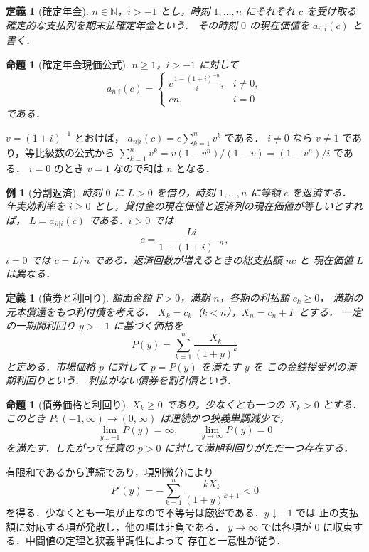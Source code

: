 \documentclass[a5paper,10pt,onecolumn]{jsarticle}
\makeatletter
\theoremstyle{mathnotetheorem}
\newtheorem{definition}[theorem]{定義}
\newtheorem{proposition}[theorem]{命題}
\newtheorem{example}[theorem]{例}
\renewcommand{\proofname}{証明}
\renewenvironment{proof}[1][\proofname]{%
  \par\pushQED{\qed}\normalfont\topsep4\p@\@plus2\p@\relax
  \trivlist\item[\hskip\labelsep\bfseries #1]\ignorespaces
}{\popQED\endtrivlist\@endpefalse}
\makeatother
\begin{document}
\begin{definition}[確定年金]
$n\in\mathbb N$，$i>-1$ とし，時刻 $1,\ldots,n$ にそれぞれ $c$ を受け取る
確定的な支払列を\emph{期末払確定年金}という．
その時刻 $0$ の現在価値を $a_{\overline{n}|i}(c)$ と書く．
\end{definition}

\begin{proposition}[確定年金現価公式]\label{prop:annuity}
$n\ge1$，$i>-1$ に対して
\[
 a_{\overline{n}|i}(c)=
 \begin{cases}
 \displaystyle c\frac{1-(1+i)^{-n}}{i},&i\ne0,\\[4pt]
 cn,&i=0
 \end{cases}
\]
である．
\end{proposition}
\begin{proof}
$v=(1+i)^{-1}$ とおけば，
$a_{\overline{n}|i}(c)=c\sum_{k=1}^n v^k$ である．
$i\ne0$ なら $v\ne1$ であり，等比級数の公式から
$\sum_{k=1}^n v^k=v(1-v^n)/(1-v)=(1-v^n)/i$ である．
$i=0$ のとき $v=1$ なので和は $n$ となる．\end{proof}

\begin{example}[分割返済]
時刻 $0$ に $L>0$ を借り，時刻 $1,\ldots,n$ に等額 $c$ を返済する．
年実効利率を $i\ge0$ とし，貸付金の現在価値と返済列の現在価値が等しいとすれば，
$L=a_{\overline{n}|i}(c)$ である．$i>0$ では
\[
 c=\frac{Li}{1-(1+i)^{-n}},
\]
$i=0$ では $c=L/n$ である．返済回数が増えるときの総支払額 $nc$ と
現在価値 $L$ は異なる．
\end{example}

\begin{definition}[債券と利回り]
額面金額 $F>0$，満期 $n$，各期の利払額 $c_k\ge0$，
満期の元本償還をもつ\emph{利付債}を考える．
$X_k=c_k$（$k<n$），$X_n=c_n+F$ とする．
一定の一期間利回り $y>-1$ に基づく価格を
\[
 P(y)=\sum_{k=1}^n\frac{X_k}{(1+y)^k}
\]
と定める．市場価格 $p$ に対して $p=P(y)$ を満たす $y$ を
この金銭授受列の\emph{満期利回り}という．
利払がない債券を\emph{割引債}という．
\end{definition}

\begin{proposition}[債券価格と利回り]\label{prop:bondmon}
$X_k\ge0$ であり，少なくとも一つの $X_k>0$ とする．
このとき $P:(-1,\infty)\to(0,\infty)$ は連続かつ狭義単調減少で，
\[
 \lim_{y\downarrow-1}P(y)=\infty,\qquad
 \lim_{y\to\infty}P(y)=0
\]
を満たす．したがって任意の $p>0$ に対して満期利回りがただ一つ存在する．
\end{proposition}
\begin{proof}
有限和であるから連続であり，項別微分により
\[
 P'(y)=-\sum_{k=1}^n\frac{kX_k}{(1+y)^{k+1}}<0
\]
を得る．少なくとも一項が正なので不等号は厳密である．$y\downarrow-1$ では
正の支払額に対応する項が発散し，他の項は非負である．
$y\to\infty$ では各項が $0$ に収束する．中間値の定理と狭義単調性によって
存在と一意性が従う．\end{proof}
\end{document}
